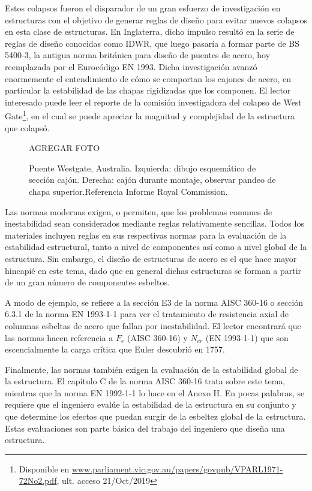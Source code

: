 Estos colapsos fueron el disparador de un gran esfuerzo de investigación en estructuras con el objetivo de generar reglas de diseño para evitar nuevos colapsos en esta clase de estructuras. En Inglaterra, dicho impulso resultó en la serie de reglas de diseño conocidas como IDWR, que luego pasaría a formar parte de BS 5400-3, la antigua norma británica para diseño de puentes de acero, hoy reemplazada por el Eurocódigo EN 1993. Dicha investigación avanzó enormemente el entendimiento de cómo se comportan los cajones de acero, en particular la estabilidad de las chapas rigidizadas que los componen. El lector interesado puede leer el reporte de la comisión investigadora del colapso de West Gate\footnote{Disponible en \href{http://www.parliament.vic.gov.au/papers/govpub/VPARL1971-72No2.pdf}{www.parliament.vic.gov.au/papers/govpub/VPARL1971-72No2.pdf}, ult. acceso 21/Oct/2019}, en el cual se puede apreciar la magnitud y complejidad de la estructura que colapsó. 

\begin{figure}[htb]
  \centering
  AGREGAR FOTO
	\caption{Puente Westgate, Australia. Izquierda: dibujo esquemático de sección cajón. Derecha: cajón durante montaje, observar pandeo de chapa superior.Referencia Informe Royal Commission.}
	\label{fig:Westgate}
\end{figure}

Las normas modernas exigen, o permiten, que los problemas comunes de inestabilidad sean considerados mediante reglas relativamente sencillas. Todos los materiales incluyen reglas en sus respectivas normas para la evaluación de la estabilidad estructural, tanto a nivel de componentes así como a nivel global de la estructura. Sin embargo, el diseño de estructuras de acero es el que hace mayor hincapié en este tema, dado que en general dichas estructuras se forman a partir de un gran número de componentes esbeltos. 

A modo de ejemplo, se refiere a la sección E3 de la norma AISC 360-16 o sección 6.3.1 de la norma EN 1993-1-1 para ver el tratamiento de resistencia axial de columnas esbeltas de acero que fallan por inestabilidad. El lector encontrará que las normas hacen referencia a $F_e$ (AISC 360-16) y $N_{cr}$ (EN 1993-1-1) que son escencialmente la carga crítica que Euler descubrió en 1757.

Finalmente, las normas también exigen la evaluación de la estabilidad global de la estructura. El capítulo C de la norma AISC 360-16 trata sobre este tema, mientras que la norma EN 1992-1-1 lo hace en el Anexo H. En pocas palabras, se requiere que el ingeniero evalúe la estabilidad de la estructura en su conjunto y que determine los efectos que puedan surgir de la esbeltez global de la estructura. Estas evaluaciones son parte básica del trabajo del ingeniero que diseña una estructura.


